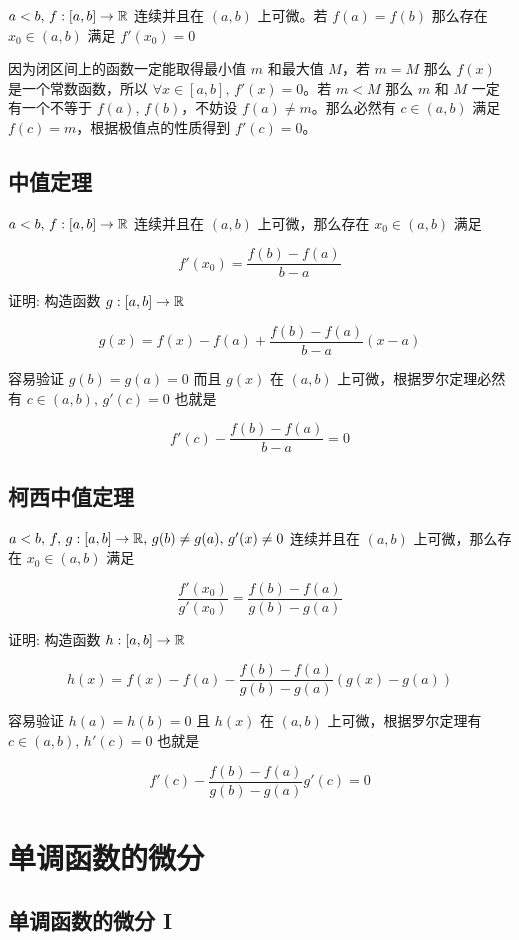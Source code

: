 $a < b,\, f: [a,b] \to \mathbb{R} $ 连续并且在 $(a,b)$ 上可微。若 $f(a) = f(b)$ 那么存在 $x_0 \in (a,b)$ 满足 $f'(x_0) = 0$

因为闭区间上的函数一定能取得最小值 $m$ 和最大值 $M$，若 $m = M$ 那么 $f(x)$ 是一个常数函数，所以 $\forall x \in [a,b],\, f'(x) = 0$。若 $m < M$
那么 $m$ 和 $M$ 一定有一个不等于 $f(a),\, f(b)$，不妨设 $f(a) \ne m$。那么必然有 $c \in (a,b)$ 满足 $f(c) = m$，根据极值点的性质得到 $f'(c) = 0$。

\subsection{中值定理}

$a < b,\, f: [a,b] \to \mathbb{R} $ 连续并且在 $(a,b)$ 上可微，那么存在 $x_0 \in (a,b)$ 满足 

\[
f'(x_0) = \frac{f(b)- f(a)}{b-a}
\]

证明: 构造函数 $g: [a,b] \to \mathbb{R}$

\[
g(x) = f(x) - f(a) + \frac{f(b)-f(a)}{b-a}(x-a)
\]

容易验证 $g(b) = g(a) = 0$ 而且 $g(x)$ 在 $(a,b)$ 上可微，根据罗尔定理必然有 $c \in (a,b),\, g'(c) = 0$ 也就是

\[
f'(c) - \frac{f(b)-f(a)}{b-a} = 0
\]

\subsection{柯西中值定理}

$a < b,\, f,\,g: [a,b] \to \mathbb{R},\, g(b) \ne g(a),\, g'(x) \ne 0 $ 连续并且在 $(a,b)$ 上可微，那么存在 $x_0 \in (a,b)$ 满足 

\[
\frac{f'(x_0)}{g'(x_0)} = \frac{f(b)- f(a)}{g(b)-g(a)}
\]

证明: 构造函数 $h: [a,b]\to \mathbb{R}$

\[
h(x) = f(x) - f(a) - \frac{f(b) - f(a)}{g(b) - g(a)}(g(x) - g(a))
\]

容易验证 $h(a) = h(b) = 0$ 且 $h(x)$ 在 $(a,b)$ 上可微，根据罗尔定理有 $c \in (a,b),\, h'(c) = 0$ 也就是

\[
f'(c) - \frac{f(b) - f(a)}{g(b) -  g(a)}g'(c) = 0
\]

\section{单调函数的微分}

\subsection{单调函数的微分 I}

